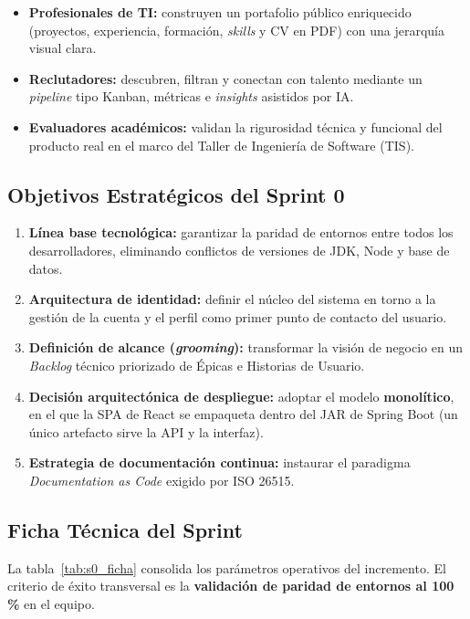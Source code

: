 \begin{itemize}[noitemsep]
    \item \textbf{Profesionales de TI:} construyen un portafolio público enriquecido
    (proyectos, experiencia, formación, \textit{skills} y CV en PDF) con una jerarquía visual
    clara.
    \item \textbf{Reclutadores:} descubren, filtran y conectan con talento mediante un
    \textit{pipeline} tipo Kanban, métricas e \textit{insights} asistidos por IA.
    \item \textbf{Evaluadores académicos:} validan la rigurosidad técnica y funcional del
    producto real en el marco del Taller de Ingeniería de Software (TIS).
\end{itemize}

\subsection{Objetivos Estratégicos del Sprint 0}
\label{ssec:s0_objetivos_estrategicos}
\begin{enumerate}[noitemsep]
    \item \textbf{Línea base tecnológica:} garantizar la paridad de entornos entre todos los
    desarrolladores, eliminando conflictos de versiones de JDK, Node y base de datos.
    \item \textbf{Arquitectura de identidad:} definir el núcleo del sistema en torno a la
    gestión de la cuenta y el perfil como primer punto de contacto del usuario.
    \item \textbf{Definición de alcance (\textit{grooming}):} transformar la visión de
    negocio en un \textit{Backlog} técnico priorizado de Épicas e Historias de Usuario.
    \item \textbf{Decisión arquitectónica de despliegue:} adoptar el modelo \textbf{monolítico},
    en el que la SPA de React se empaqueta dentro del JAR de Spring Boot (un único artefacto
    sirve la API y la interfaz).
    \item \textbf{Estrategia de documentación continua:} instaurar el paradigma
    \textit{Documentation as Code} exigido por ISO 26515.
\end{enumerate}

\subsection{Ficha Técnica del Sprint}
\label{ssec:s0_ficha}
La tabla~\ref{tab:s0_ficha} consolida los parámetros operativos del incremento. El criterio
de éxito transversal es la \textbf{validación de paridad de entornos al 100\,\%} en el equipo.

